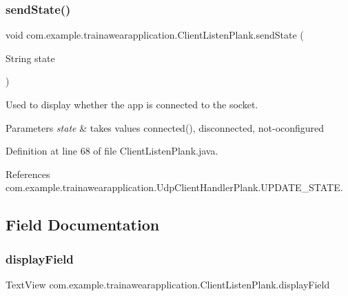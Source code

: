 \subsubsection{\texorpdfstring{sendState()}{sendState()}}
{\footnotesize\ttfamily void com.\+example.\+trainawearapplication.\+Client\+Listen\+Plank.\+send\+State (\begin{DoxyParamCaption}\item[{String}]{state }\end{DoxyParamCaption})\hspace{0.3cm}{\ttfamily [private]}}



Used to display whether the app is connected to the socket. 


\begin{DoxyParams}{Parameters}
{\em state} & takes values connected(), disconnected, not-\/oconfigured \\
\hline
\end{DoxyParams}


Definition at line 68 of file Client\+Listen\+Plank.\+java.


\begin{DoxyCode}{0}

\end{DoxyCode}


References com.\+example.\+trainawearapplication.\+Udp\+Client\+Handler\+Plank.\+U\+P\+D\+A\+T\+E\+\_\+\+S\+T\+A\+TE.



\subsection{Field Documentation}
\mbox{\label{classcom_1_1example_1_1trainawearapplication_1_1_client_listen_plank_a2b606ab855a6ec1cabbb5f84a0eb1de0}} 
\subsubsection{\texorpdfstring{displayField}{displayField}}
{\footnotesize\ttfamily Text\+View com.\+example.\+trainawearapplication.\+Client\+Listen\+Plank.\+display\+Field\hspace{0.3cm}{\ttfamily [private]}}



